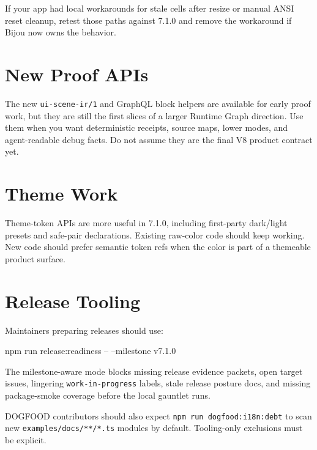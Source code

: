 If your app had local workarounds for stale cells after resize or manual ANSI reset cleanup, retest those paths against 7.1.0 and remove the workaround if Bijou now owns the behavior.

\section{New Proof APIs}\label{record-271-new-proof-apis}

The new \texttt{u\allowbreak{}i\allowbreak{}-\allowbreak{}s\allowbreak{}c\allowbreak{}e\allowbreak{}n\allowbreak{}e\allowbreak{}-\allowbreak{}i\allowbreak{}r\allowbreak{}/\allowbreak{}1} and GraphQL block helpers are available for early proof work, but they are still the first slices of a larger Runtime Graph direction. Use them when you want deterministic receipts, source maps, lower modes, and agent-readable debug facts. Do not assume they are the final V8 product contract yet.

\section{Theme Work}\label{record-271-theme-work}

Theme-token APIs are more useful in 7.1.0, including first-party dark/light presets and safe-pair declarations. Existing raw-color code should keep working. New code should prefer semantic token refs when the color is part of a themeable product surface.

\section{Release Tooling}\label{record-271-release-tooling}

Maintainers preparing releases should use:

\begin{CodeBlock}
npm run release:readiness -- --milestone v7.1.0
\end{CodeBlock}

The milestone-aware mode blocks missing release evidence packets, open target issues, lingering \texttt{w\allowbreak{}o\allowbreak{}r\allowbreak{}k\allowbreak{}-\allowbreak{}i\allowbreak{}n\allowbreak{}-\allowbreak{}p\allowbreak{}r\allowbreak{}o\allowbreak{}g\allowbreak{}r\allowbreak{}e\allowbreak{}s\allowbreak{}s} labels, stale release posture docs, and missing package-smoke coverage before the local gauntlet runs.

DOGFOOD contributors should also expect \texttt{n\allowbreak{}p\allowbreak{}m\allowbreak{} \allowbreak{}r\allowbreak{}u\allowbreak{}n\allowbreak{} \allowbreak{}d\allowbreak{}o\allowbreak{}g\allowbreak{}f\allowbreak{}o\allowbreak{}o\allowbreak{}d\allowbreak{}:\allowbreak{}i\allowbreak{}1\allowbreak{}8\allowbreak{}n\allowbreak{}:\allowbreak{}d\allowbreak{}e\allowbreak{}b\allowbreak{}t} to scan new \texttt{e\allowbreak{}x\allowbreak{}a\allowbreak{}m\allowbreak{}p\allowbreak{}l\allowbreak{}e\allowbreak{}s\allowbreak{}/\allowbreak{}d\allowbreak{}o\allowbreak{}c\allowbreak{}s\allowbreak{}/\allowbreak{}*\allowbreak{}*\allowbreak{}/\allowbreak{}*\allowbreak{}.\allowbreak{}t\allowbreak{}s} modules by default. Tooling-only exclusions must be explicit.

